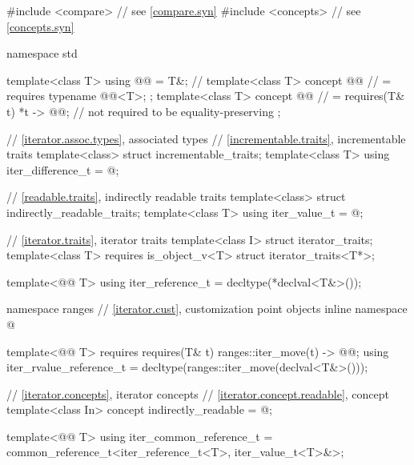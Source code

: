 %
\begin{codeblock}
#include <compare>              // see \ref{compare.syn}
#include <concepts>             // see \ref{concepts.syn}

namespace std {
  template<class T> using @@ = T&;  // \expos
  template<class T> concept @@       // \expos
    = requires { typename @@<T>; };
  template<class T> concept @@     // \expos
    = requires(T& t) {
      { *t } -> @@;  // not required to be equality-preserving
    };

  // \ref{iterator.assoc.types}, associated types
  // \ref{incrementable.traits}, incrementable traits
  template<class> struct incrementable_traits;
  template<class T>
    using iter_difference_t = @\seebelow@;

  // \ref{readable.traits}, indirectly readable traits
  template<class> struct indirectly_readable_traits;
  template<class T>
    using iter_value_t = @\seebelow@;

  // \ref{iterator.traits}, iterator traits
  template<class I> struct iterator_traits;
  template<class T> requires is_object_v<T> struct iterator_traits<T*>;

  template<@@ T>
    using iter_reference_t = decltype(*declval<T&>());

  namespace ranges {
    // \ref{iterator.cust}, customization point objects
    inline namespace @
  }

  template<@@ T>
    requires requires(T& t) {
      { ranges::iter_move(t) } -> @@;
    }
  using iter_rvalue_reference_t
    = decltype(ranges::iter_move(declval<T&>()));

  // \ref{iterator.concepts}, iterator concepts
  // \ref{iterator.concept.readable}, concept 
  template<class In>
    concept indirectly_readable = @\seebelow@;

  template<@@ T>
    using iter_common_reference_t =
      common_reference_t<iter_reference_t<T>, iter_value_t<T>&>;

}
\end{codeblock}

